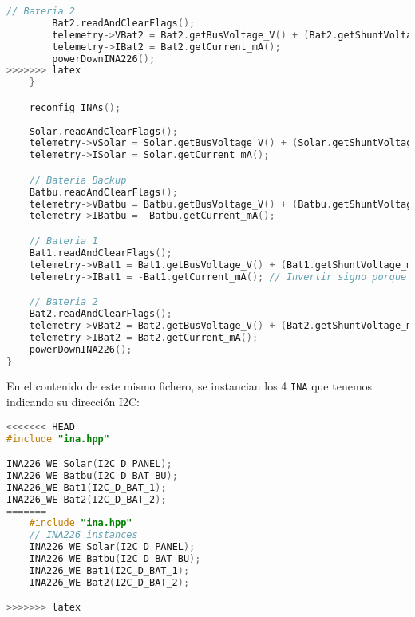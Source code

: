 \begin{itemize}
\begin{lstlisting}[captionpos=b, caption={Codigo funcion measureINA226}, language=c++]
        // Bateria 2
        Bat2.readAndClearFlags();
        telemetry->VBat2 = Bat2.getBusVoltage_V() + (Bat2.getShuntVoltage_mV() / 100);
        telemetry->IBat2 = Bat2.getCurrent_mA();
        powerDownINA226();
>>>>>>> latex
    }

    reconfig_INAs();
    
    Solar.readAndClearFlags();
    telemetry->VSolar = Solar.getBusVoltage_V() + (Solar.getShuntVoltage_mV() / 100);
    telemetry->ISolar = Solar.getCurrent_mA();

    // Bateria Backup
    Batbu.readAndClearFlags();
    telemetry->VBatbu = Batbu.getBusVoltage_V() + (Batbu.getShuntVoltage_mV() / 100);
    telemetry->IBatbu = -Batbu.getCurrent_mA();

    // Bateria 1
    Bat1.readAndClearFlags();
    telemetry->VBat1 = Bat1.getBusVoltage_V() + (Bat1.getShuntVoltage_mV() / 100);
    telemetry->IBat1 = -Bat1.getCurrent_mA(); // Invertir signo porque esta al reves

    // Bateria 2
    Bat2.readAndClearFlags();
    telemetry->VBat2 = Bat2.getBusVoltage_V() + (Bat2.getShuntVoltage_mV() / 100);
    telemetry->IBat2 = Bat2.getCurrent_mA();
    powerDownINA226();
}
\end{lstlisting}

En el contenido de este mismo fichero, se instancian los 4 \texttt{INA} que tenemos indicando su dirección I2C:

\begin{lstlisting}[captionpos=b, caption={Instancia de las direcciones de los \texttt{INA}.}, language=c++]
<<<<<<< HEAD
#include "ina.hpp"

INA226_WE Solar(I2C_D_PANEL);
INA226_WE Batbu(I2C_D_BAT_BU);
INA226_WE Bat1(I2C_D_BAT_1);
INA226_WE Bat2(I2C_D_BAT_2);
=======
    #include "ina.hpp"
    // INA226 instances
    INA226_WE Solar(I2C_D_PANEL);
    INA226_WE Batbu(I2C_D_BAT_BU);
    INA226_WE Bat1(I2C_D_BAT_1);
    INA226_WE Bat2(I2C_D_BAT_2);

>>>>>>> latex
\end{lstlisting}

\end{itemize}
